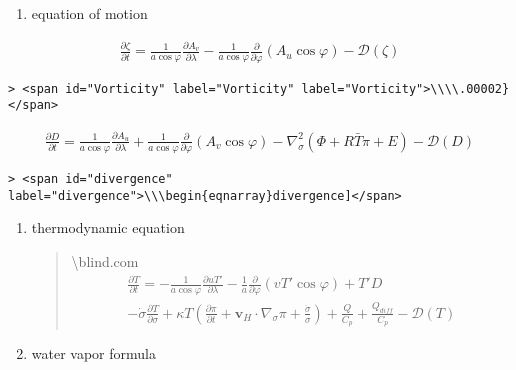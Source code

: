 \begin{enumerate}
\def\labelenumi{\arabic{enumi}.}
\setcounter{enumi}{2}
\tightlist
\item
  equation of motion
\end{enumerate}

\begin{eqnarray}
  \frac{\partial \zeta}{\partial t} 
     =   \frac{1}{a\cos\varphi}
            \frac{\partial A_v}{\partial \lambda}
          - \frac{1}{a\cos \varphi}
            \frac{\partial}{\partial \varphi} ( A_u \cos\varphi )
          - {\mathcal D}(\zeta) 
\end{eqnarray}

\begin{verbatim}
> <span id="Vorticity" label="Vorticity" label="Vorticity">\\\\.00002}</span>
\end{verbatim}

\begin{eqnarray}
  \frac{\partial D}{\partial t} 
     =    \frac{1}{a\cos\varphi}
            \frac{\partial A_u}{\partial \lambda}
          + \frac{1}{a\cos\varphi}
            \frac{\partial }{\partial \varphi} ( A_v \cos\varphi )
          - \nabla^{2}_{\sigma}
           ( \Phi + R \bar{T} \pi + E ) 
          - {\mathcal D}(D) 
\end{eqnarray}

\begin{verbatim}
> <span id="divergence" label="divergence">\\\begin{eqnarray}divergence]</span>
\end{verbatim}

\begin{enumerate}
\def\labelenumi{\arabic{enumi}.}
\setcounter{enumi}{3}
\item
  thermodynamic equation

  \begin{quote}
  \textbackslash blind\blind\blind.com \begin{eqnarray}
  \frac{\partial T}{\partial t}
  =  - \frac{1}{a\cos\varphi}
  \frac{\partial uT'}{\partial \lambda}
  - \frac{1}{a}
  \frac{\partial }{\partial \varphi} ( vT' \cos\varphi )
  + T' D  \\
  - \dot{\sigma} 
  \frac{\partial T }{\partial \sigma}
  + \kappa T \left( \frac{\partial \pi}{\partial t}
  + \mathbf{v}_{H} \cdot \nabla_{\sigma} \pi 
  + \frac{ \dot{\sigma} }{ \sigma } 
  \right)
  + \frac{Q}{C_{p}}
  + \frac{Q_{diff}}{C_{p}}
  - {\mathcal D}(T) 
  \end{eqnarray}
  \end{quote}
\item
  water vapor formula
\end{enumerate}

